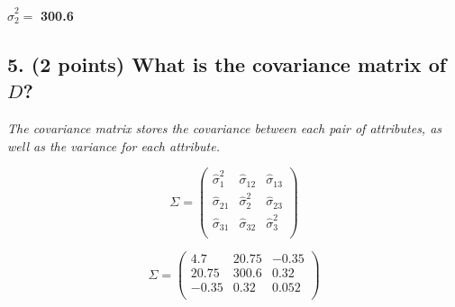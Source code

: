 \documentclass[11pt]{article}
\begin{document}
\begin{tcolorbox}[title=Problem 2.4]
    $\hat{\sigma}^{2}_{2} = $ \textbf{300.6}
\end{tcolorbox}

\subsection*{\textbf{5. (2 points)} What is the covariance matrix of $D$?}

\textit{The covariance matrix stores the covariance between each pair of attributes, as well as the variance for each attribute.}

$$\Sigma = \left( \begin{matrix}
\hat{\sigma}_1^2  & \hat{\sigma}_{12} & \hat{\sigma}_{13}\\
\hat{\sigma}_{21} & \hat{\sigma}_{2}^2  & \hat{\sigma}_{23}\\
\hat{\sigma}_{31} & \hat{\sigma}_{32} & \hat{\sigma}_{3}^2\\
\end{matrix} \right)$$



\begin{tcolorbox}[title=Problem 2.5]
    $$\Sigma = \left( \begin{matrix}
    4.7  & 20.75 & -0.35 \\
    20.75 & 300.6  & 0.32 \\
    -0.35 & 0.32 & 0.052 \\
    \end{matrix} \right)$$
\end{tcolorbox}
\end{document}
